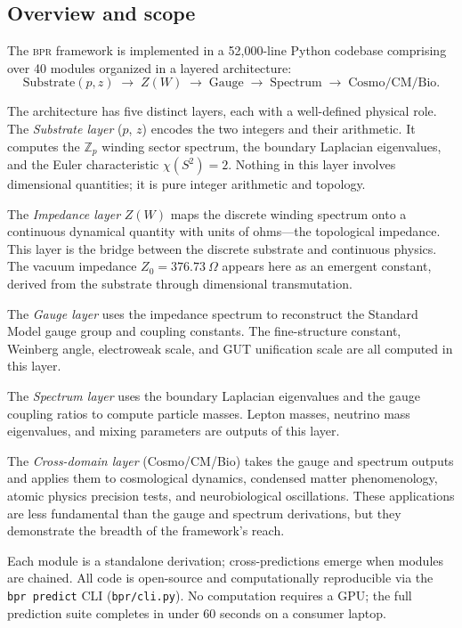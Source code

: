 \documentclass[aps,prd,twocolumn,superscriptaddress,longbibliography,nofootinbib]{revtex4-2}
\newcommand{\Zp}{\mathbb{Z}_p}
\newcommand{\Stwo}{S^2}
\newcommand{\Zimp}{Z}
\newcommand{\Zvac}{Z_0}
\newcommand{\bpr}{\textsc{bpr}}
\begin{document}
\subsection{Overview and scope}

The \bpr{} framework is implemented in a 52{,}000-line Python
codebase comprising over 40 modules organized in a layered
architecture:
\begin{equation}
\text{Substrate}(p,z) \;\to\; \Zimp(W) \;\to\;
\text{Gauge} \;\to\; \text{Spectrum} \;\to\;
\text{Cosmo/CM/Bio}.
\label{eq:architecture}
\end{equation}

The architecture has five distinct layers, each with a well-defined
physical role.  The \textit{Substrate layer} ($p$, $z$) encodes the
two integers and their arithmetic.  It computes the $\Zp$ winding
sector spectrum, the boundary Laplacian eigenvalues, and the Euler
characteristic $\chi(\Stwo) = 2$.  Nothing in this layer involves
dimensional quantities; it is pure integer arithmetic and topology.

The \textit{Impedance layer} $\Zimp(W)$ maps the discrete winding
spectrum onto a continuous dynamical quantity with units of ohms---the
topological impedance.  This layer is the bridge between the discrete
substrate and continuous physics.  The vacuum impedance
$\Zvac = 376.73~\Omega$ appears here as an emergent constant, derived
from the substrate through dimensional transmutation.

The \textit{Gauge layer} uses the impedance spectrum to reconstruct
the Standard Model gauge group and coupling constants.  The
fine-structure constant, Weinberg angle, electroweak scale, and GUT
unification scale are all computed in this layer.

The \textit{Spectrum layer} uses the boundary Laplacian eigenvalues
and the gauge coupling ratios to compute particle masses.  Lepton
masses, neutrino mass eigenvalues, and mixing parameters are outputs
of this layer.

The \textit{Cross-domain layer} (Cosmo/CM/Bio) takes the gauge and
spectrum outputs and applies them to cosmological dynamics, condensed
matter phenomenology, atomic physics precision tests, and
neurobiological oscillations.  These applications are less
fundamental than the gauge and spectrum derivations, but they
demonstrate the breadth of the framework's reach.

Each module is a standalone derivation; cross-predictions emerge
when modules are chained.  All code is open-source and
computationally reproducible via the \texttt{bpr predict} CLI
(\texttt{bpr/cli.py}).  No computation requires a GPU; the full
prediction suite completes in under 60 seconds on a consumer
laptop.
\end{document}
